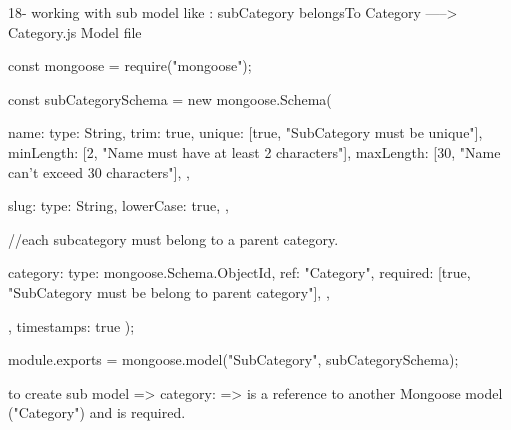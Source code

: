 18- working with sub model like : subCategory  belongsTo Category ----->  Category.js Model file
                         

                         const mongoose = require("mongoose");

                                    const subCategorySchema = new mongoose.Schema(
                                    {
                                        name: {
                                            type: String,
                                            trim: true,
                                            unique: [true, "SubCategory must be unique"],
                                            minLength: [2, "Name must have at least 2 characters"],
                                            maxLength: [30, "Name can't exceed 30 characters"],
                                        },

                                        slug: {
                                            type: String,
                                            lowerCase: true,
                                        },

                                        //each subcategory must belong to a parent category.

                                        category: {
                                            type: mongoose.Schema.ObjectId, 
                                            ref: "Category",
                                            required: [true, "SubCategory must be belong to parent category"],
                                        },
                                    },
                                    { timestamps: true }
                                    );

                                    module.exports = mongoose.model("SubCategory", subCategorySchema);

                    
                    to create sub model => 
                        category:{} => is a reference to another Mongoose model ("Category") and is required.
                                   
